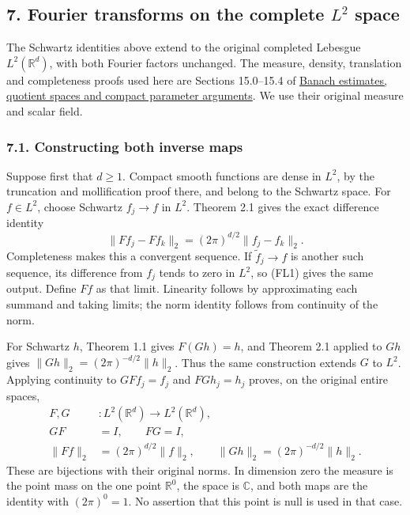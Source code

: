 \documentclass[
  11pt,
]{article}
\begin{document}
\subsection{\texorpdfstring{7. Fourier transforms on the complete
\(L^2\)
space}{7. Fourier transforms on the complete L\^{}2 space}}\label{fourier-transforms-on-the-complete-l2-space}

The Schwartz identities above extend to the original completed Lebesgue
\(L^2(\mathbb R^d)\), with both Fourier factors unchanged. The measure,
density, translation and completeness proofs used here are Sections
15.0--15.4 of \href{banach-foundation-bridges.pdf}{Banach estimates,
quotient spaces and compact parameter arguments}. We use their original
measure and scalar field.

\subsubsection{7.1. Constructing both inverse
maps}\label{constructing-both-inverse-maps}

Suppose first that \(d\geq1\). Compact smooth functions are dense in
\(L^2\), by the truncation and mollification proof there, and belong to
the Schwartz space. For \(f\in L^2\), choose Schwartz \(f_j\to f\) in
\(L^2\). Theorem 2.1 gives the exact difference identity \[
 \|Ff_j-Ff_k\|_2=(2\pi)^{d/2}\|f_j-f_k\|_2.
                                                               \tag{FL1}
\] Completeness makes this a convergent sequence. If
\(\widetilde f_j\to f\) is another such sequence, its difference from
\(f_j\) tends to zero in \(L^2\), so (FL1) gives the same output. Define
\(Ff\) as that limit. Linearity follows by approximating each summand
and taking limits; the norm identity follows from continuity of the
norm.

For Schwartz \(h\), Theorem 1.1 gives \(F(Gh)=h\), and Theorem 2.1
applied to \(Gh\) gives \(\|Gh\|_2=(2\pi)^{-d/2}\|h\|_2\). Thus the same
construction extends \(G\) to \(L^2\). Applying continuity to
\(GFf_j=f_j\) and \(FGh_j=h_j\) proves, on the original entire spaces,
\[
 \begin{split}
 F,G&:L^2(\mathbb R^d)\longrightarrow L^2(\mathbb R^d),\\
 GF&=I,\qquad FG=I,\\
 \|Ff\|_2&=(2\pi)^{d/2}\|f\|_2,\qquad
 \|Gh\|_2=(2\pi)^{-d/2}\|h\|_2 .
 \end{split}                                                   \tag{FL2}
\] These are bijections with their original norms. In dimension zero the
measure is the point mass on the one point \(\mathbb R^0\), the space is
\(\mathbb C\), and both maps are the identity with \((2\pi)^0=1\). No
assertion that this point is null is used in that case.
\end{document}
